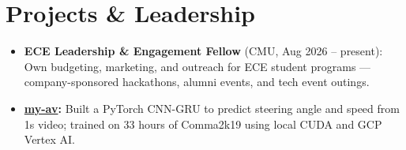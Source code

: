 \documentclass[11pt, letterpaper]{article}
\begin{document}
\section{Projects \& Leadership}
\begin{itemize}
  \item \textbf{ECE Leadership \& Engagement Fellow} (CMU, Aug 2026 -- present): Own budgeting, marketing, and outreach for ECE student programs --- company-sponsored hackathons, alumni events, and tech event outings.
  \item \textbf{\href{https://github.com/lordphone/my-av}{my-av}:} Built a PyTorch CNN-GRU to predict steering angle and speed from 1s video; trained on 33 hours of Comma2k19 using local CUDA and GCP Vertex AI.
\end{itemize}
\end{document}
